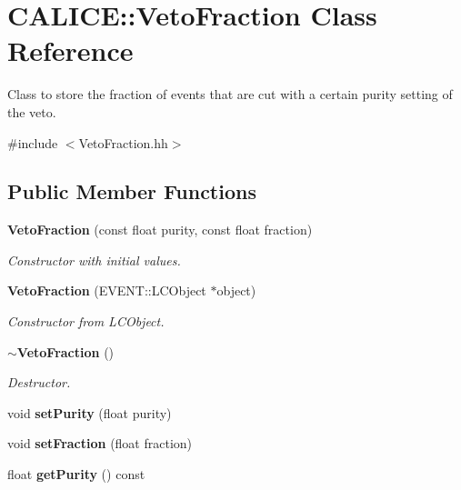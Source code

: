 \section{CALICE::VetoFraction Class Reference}
\label{classCALICE_1_1VetoFraction}


Class to store the fraction of events that are cut with a certain purity setting of the veto.  


{\ttfamily \#include $<$VetoFraction.hh$>$}\subsection*{Public Member Functions}
\begin{DoxyCompactItemize}
\item 
{\bf VetoFraction} (const float purity, const float fraction)\label{classCALICE_1_1VetoFraction_a59c07a9bd31ae6165122a1b09411a483}

\begin{DoxyCompactList}\small\item\em Constructor with initial values. \item\end{DoxyCompactList}\item 
{\bf VetoFraction} (EVENT::LCObject $\ast$object)\label{classCALICE_1_1VetoFraction_ac5fd6ab373c417aac1c6868619bf90c2}

\begin{DoxyCompactList}\small\item\em Constructor from LCObject. \item\end{DoxyCompactList}\item 
{\bf $\sim$VetoFraction} ()\label{classCALICE_1_1VetoFraction_a55a93867c38ed1f4bdfee8ca2ef831c6}

\begin{DoxyCompactList}\small\item\em Destructor. \item\end{DoxyCompactList}\item 
void {\bfseries setPurity} (float purity)\label{classCALICE_1_1VetoFraction_abd9f68b2c4142c9800f08ee310fb102f}

\item 
void {\bfseries setFraction} (float fraction)\label{classCALICE_1_1VetoFraction_a7340533b1d5cd86a94225f7ccc9bad73}

\item 
float {\bf getPurity} () const \label{classCALICE_1_1VetoFraction_a2b458d1246e49a5b8176e8c224ba0ba1}


\end{DoxyCompactItemize}
